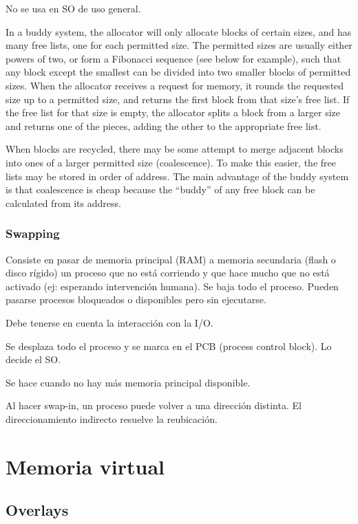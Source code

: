 \documentclass[a4paper, twoside]{article}
\begin{document}
No se usa en SO de uso general.

In a buddy system, the allocator will only allocate blocks of certain sizes,
and has many free lists, one for each permitted size.
The permitted sizes are usually either powers of two, or form a Fibonacci
sequence (see below for example), such that any block except the smallest can
be divided into two smaller blocks of permitted sizes.
When the allocator receives a request for memory, it rounds the requested size
up to a permitted size, and returns the first block from that size’s free list.
If the free list for that size is empty, the allocator splits a block from a
larger size and returns one of the pieces, adding the other to the appropriate
free list.

When blocks are recycled, there may be some attempt to merge adjacent blocks
into ones of a larger permitted size (coalescence).
To make this easier, the free lists may be stored in order of address.
The main advantage of the buddy system is that coalescence is cheap because the
``buddy'' of any free block can be calculated from its address.

\subsubsection{Swapping}

Consiste en pasar de memoria principal (RAM) a memoria secundaria (flash o
disco rígido) un proceso que no está corriendo y que hace mucho que no está
activado (ej: esperando intervención humana). Se baja todo el proceso.
Pueden pasarse procesos bloqueados o disponibles pero sin ejecutarse.

Debe tenerse en cuenta la interacción con la I/O.

Se desplaza todo el proceso y se marca en el PCB (process control block).
Lo decide el SO.

Se hace cuando no hay más memoria principal disponible. 

Al hacer swap-in, un proceso puede volver a una dirección distinta.
El direccionamiento indirecto resuelve la reubicación.

\newpage
\section{Memoria virtual}

\subsection{Overlays}
\end{document}
